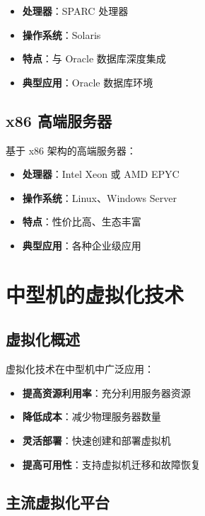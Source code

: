 \documentclass[12pt,UTF8]{ctexbook}
\begin{document}
\begin{itemize}[leftmargin=2cm]
    \item \textbf{处理器}：SPARC 处理器
    \item \textbf{操作系统}：Solaris
    \item \textbf{特点}：与 Oracle 数据库深度集成
    \item \textbf{典型应用}：Oracle 数据库环境
\end{itemize}

\section{x86 高端服务器}

基于 x86 架构的高端服务器：

\begin{itemize}[leftmargin=2cm]
    \item \textbf{处理器}：Intel Xeon 或 AMD EPYC
    \item \textbf{操作系统}：Linux、Windows Server
    \item \textbf{特点}：性价比高、生态丰富
    \item \textbf{典型应用}：各种企业级应用
\end{itemize}

\chapter{中型机的虚拟化技术}
\label{chap:virtualization}

\section{虚拟化概述}

虚拟化技术在中型机中广泛应用：

\begin{itemize}[leftmargin=2cm]
    \item \textbf{提高资源利用率}：充分利用服务器资源
    \item \textbf{降低成本}：减少物理服务器数量
    \item \textbf{灵活部署}：快速创建和部署虚拟机
    \item \textbf{提高可用性}：支持虚拟机迁移和故障恢复
\end{itemize}

\section{主流虚拟化平台}
\end{document}
